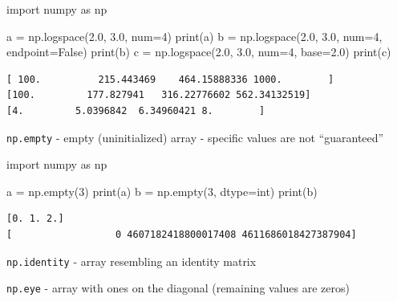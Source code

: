 \documentclass[
  english,
  letterpaper,
  DIV=11,
  numbers=noendperiod]{scrreprt}
\newenvironment{Shaded}{\begin{snugshade}}{\end{snugshade}}
\newcommand{\BuiltInTok}[1]{\textcolor[rgb]{0.00,0.23,0.31}{#1}}
\newcommand{\DecValTok}[1]{\textcolor[rgb]{0.68,0.00,0.00}{#1}}
\newcommand{\FloatTok}[1]{\textcolor[rgb]{0.68,0.00,0.00}{#1}}
\newcommand{\ImportTok}[1]{\textcolor[rgb]{0.00,0.46,0.62}{#1}}
\newcommand{\NormalTok}[1]{\textcolor[rgb]{0.00,0.23,0.31}{#1}}
\newcommand{\OperatorTok}[1]{\textcolor[rgb]{0.37,0.37,0.37}{#1}}
\newcommand{\VariableTok}[1]{\textcolor[rgb]{0.07,0.07,0.07}{#1}}
\begin{document}
\begin{Shaded}
\begin{Highlighting}[]
\ImportTok{import}\NormalTok{ numpy }\ImportTok{as}\NormalTok{ np}

\NormalTok{a }\OperatorTok{=}\NormalTok{ np.logspace(}\FloatTok{2.0}\NormalTok{, }\FloatTok{3.0}\NormalTok{, num}\OperatorTok{=}\DecValTok{4}\NormalTok{)}
\BuiltInTok{print}\NormalTok{(a)}
\NormalTok{b }\OperatorTok{=}\NormalTok{ np.logspace(}\FloatTok{2.0}\NormalTok{, }\FloatTok{3.0}\NormalTok{, num}\OperatorTok{=}\DecValTok{4}\NormalTok{, endpoint}\OperatorTok{=}\VariableTok{False}\NormalTok{)}
\BuiltInTok{print}\NormalTok{(b)}
\NormalTok{c }\OperatorTok{=}\NormalTok{ np.logspace(}\FloatTok{2.0}\NormalTok{, }\FloatTok{3.0}\NormalTok{, num}\OperatorTok{=}\DecValTok{4}\NormalTok{, base}\OperatorTok{=}\FloatTok{2.0}\NormalTok{)}
\BuiltInTok{print}\NormalTok{(c)}
\end{Highlighting}
\end{Shaded}

\begin{verbatim}
[ 100.          215.443469    464.15888336 1000.        ]
[100.         177.827941   316.22776602 562.34132519]
[4.         5.0396842  6.34960421 8.        ]
\end{verbatim}

\texttt{np.empty} - empty (uninitialized) array - specific values are
not ``guaranteed''

\begin{Shaded}
\begin{Highlighting}[]
\ImportTok{import}\NormalTok{ numpy }\ImportTok{as}\NormalTok{ np}

\NormalTok{a }\OperatorTok{=}\NormalTok{ np.empty(}\DecValTok{3}\NormalTok{)}
\BuiltInTok{print}\NormalTok{(a)}
\NormalTok{b }\OperatorTok{=}\NormalTok{ np.empty(}\DecValTok{3}\NormalTok{, dtype}\OperatorTok{=}\BuiltInTok{int}\NormalTok{)}
\BuiltInTok{print}\NormalTok{(b)}
\end{Highlighting}
\end{Shaded}

\begin{verbatim}
[0. 1. 2.]
[                  0 4607182418800017408 4611686018427387904]
\end{verbatim}

\texttt{np.identity} - array resembling an identity matrix

\texttt{np.eye} - array with ones on the diagonal (remaining values are
zeros)
\end{document}
